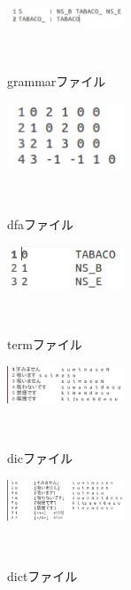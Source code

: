 \documentclass[a4paper]{jarticle}
\begin{document}
\begin{thebibliography}{1}
\begin{figure}[h]
 \begin{center}
  \includegraphics[width=35mm]{img/grammar.png}
 　\caption{grammarファイル}
 　\label{fig:grammar}
 \end{center}
\end{figure}


\begin{figure}[h]
 \begin{center}
  \includegraphics[width=35mm]{img/dfa.png}
 　\caption{dfaファイル}
 　\label{fig:dfa}
 \end{center}
\end{figure}


\begin{figure}[h]
 \begin{center}
  \includegraphics[width=35mm]{img/term.png}
 　\caption{termファイル}
 　\label{fig:term}
 \end{center}
\end{figure}


\begin{figure}[h]
 \begin{center}
  \includegraphics[width=35mm]{img/dic.png}
 　\caption{dicファイル}
 　\label{fig:dic}
 \end{center}
\end{figure}


\begin{figure}[h]
 \begin{center}
  \includegraphics[width=35mm]{img/dict.png}
 　\caption{dictファイル}
 　\label{fig:dict}
 \end{center}
\end{figure}



\end{thebibliography}
\end{document}
